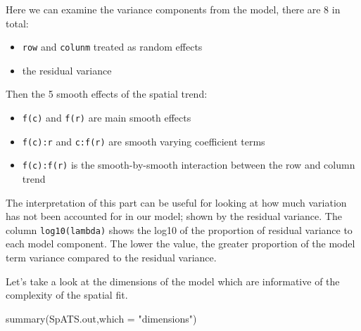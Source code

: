 \documentclass[
]{book}
\newenvironment{Shaded}{\begin{snugshade}}{\end{snugshade}}
\newcommand{\AttributeTok}[1]{\textcolor[rgb]{0.77,0.63,0.00}{#1}}
\newcommand{\FunctionTok}[1]{\textcolor[rgb]{0.00,0.00,0.00}{#1}}
\newcommand{\NormalTok}[1]{#1}
\newcommand{\StringTok}[1]{\textcolor[rgb]{0.31,0.60,0.02}{#1}}
\providecommand{\tightlist}{%
  \setlength{\itemsep}{0pt}\setlength{\parskip}{0pt}}
\begin{document}
Here we can examine the variance components from the model, there are 8 in total:

\begin{itemize}
\tightlist
\item
  \texttt{row} and \texttt{colunm} treated as random effects
\item
  the residual variance
\end{itemize}

Then the 5 smooth effects of the spatial trend:

\begin{itemize}
\tightlist
\item
  \texttt{f(c)} and \texttt{f(r)} are main smooth effects
\item
  \texttt{f(c):r} and \texttt{c:f(r)} are smooth varying coefficient terms
\item
  \texttt{f(c):f(r)} is the smooth-by-smooth interaction between the row and column trend
\end{itemize}

The interpretation of this part can be useful for looking at how much variation has not been accounted for in our model; shown by the residual variance. The column \texttt{log10(lambda)} shows the log10 of the proportion of residual variance to each model component. The lower the value, the greater proportion of the model term variance compared to the residual variance.

Let's take a look at the dimensions of the model which are informative of the complexity of the spatial fit.

\begin{Shaded}
\begin{Highlighting}[]
\FunctionTok{summary}\NormalTok{(SpATS.out,}\AttributeTok{which =} \StringTok{"dimensions"}\NormalTok{)}
\end{Highlighting}
\end{Shaded}
\end{document}
